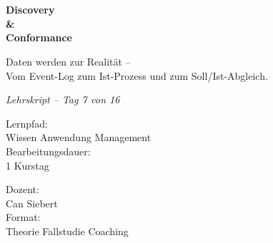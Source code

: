 \documentclass[11pt,a4paper,oneside]{article}
\newcommand{\caveatfontfallback}{\itshape}
\newcommand\caveatfont{\caveatfontfallback}%
\begin{document}
\begin{titlepage}
  \pagestyle{empty}
  \vspace*{1.5cm}
  \\[2pt]
  \noindent{\color{lpAccent}\rule{\linewidth}{1.2pt}}\\[4pt]

  \vspace{3cm}
  {\sffamily\fontsize{30}{34}\selectfont\bfseries\color{lpInk}Discovery\\\&\\Conformance\par}

  \vspace{0.7cm}
  {\sffamily\large\color{lpGray}Daten werden zur Realität --\\Vom Event-Log zum Ist-Prozess und zum Soll/Ist-Abgleich.\par}

  \vspace{1.5cm}
  {\caveatfont\LARGE\color{lpAmber}Lehrskript -- Tag 7 von 16}\par

  \vfill

  \noindent\begin{minipage}{0.55\linewidth}
    {\sffamily\footnotesize\color{lpGray}Lernpfad:}\\
    {\sffamily\small\color{lpInk}Wissen \textrightarrow{} Anwendung \textrightarrow{} Management}\\[10pt]
    {\sffamily\footnotesize\color{lpGray}Bearbeitungsdauer:}\\
    {\sffamily\small\color{lpInk}1 Kurstag}
  \end{minipage}\hfill
  \begin{minipage}{0.4\linewidth}
    \raggedleft
    {\sffamily\footnotesize\color{lpGray}Dozent:}\\
    {\sffamily\small\color{lpInk}Can Siebert}\\[10pt]
    {\sffamily\footnotesize\color{lpGray}Format:}\\
    {\sffamily\small\color{lpInk}Theorie \textperiodcentered{} Fallstudie \textperiodcentered{} Coaching}
  \end{minipage}

  \vspace{0.5cm}
  \noindent{\color{lpAccent}\rule{\linewidth}{0.6pt}}
\end{titlepage}
\end{document}
